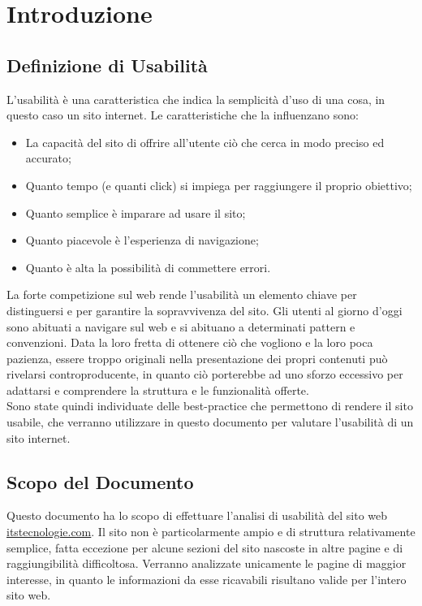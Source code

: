 \section{Introduzione}

\subsection{Definizione di Usabilità}
L'usabilità è una caratteristica che indica la semplicità d'uso di una cosa, in questo caso un sito internet. Le caratteristiche che la influenzano sono:
\begin{itemize}
	\item La capacità del sito di offrire all'utente ciò che cerca in modo preciso ed accurato;
	\item Quanto tempo (e quanti click) si impiega per raggiungere il proprio obiettivo;
	\item Quanto semplice è imparare ad usare il sito;
	\item Quanto piacevole è l'esperienza di navigazione;
	\item Quanto è alta la possibilità di commettere errori.
\end{itemize}
La forte competizione sul web rende l'usabilità un elemento chiave per distinguersi e per garantire la sopravvivenza del sito. Gli utenti al giorno d'oggi sono abituati a navigare sul web e si abituano a determinati pattern e convenzioni. Data la loro fretta di ottenere ciò che vogliono e la loro poca pazienza, essere troppo originali nella presentazione dei propri contenuti può rivelarsi controproducente, in quanto ciò porterebbe ad uno sforzo eccessivo per adattarsi e comprendere la struttura e le funzionalità offerte. \\
Sono state quindi individuate delle best-practice che permettono di rendere il sito usabile, che verranno utilizzare in questo documento per valutare l'usabilità di un sito internet.

\subsection{Scopo del Documento}
Questo documento ha lo scopo di effettuare l'analisi di usabilità del sito web \url{itstecnologie.com}. Il sito non è particolarmente ampio e di struttura relativamente semplice, fatta eccezione per alcune sezioni del sito nascoste in altre pagine e di raggiungibilità difficoltosa. Verranno analizzate unicamente le pagine di maggior interesse, in quanto le informazioni da esse ricavabili risultano valide per l'intero sito web.
